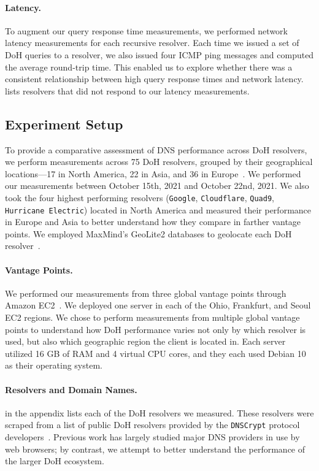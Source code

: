 \paragraph{Latency.}
To augment our query response time measurements, we performed network latency measurements for each recursive resolver.
Each time we issued a set of DoH queries to a resolver, we also issued four ICMP ping messages and computed the average round-trip time.
This enabled us to explore whether there was a consistent relationship between high query response times and network latency.
 lists resolvers that did not respond to our latency measurements.

\subsection{Experiment Setup}
To provide a comparative assessment of DNS performance across DoH resolvers, we perform measurements across 75 DoH resolvers, grouped by their geographical locations—17 in North America, 22 in Asia, and 36 in Europe~\cite{dnscrypt}.
We performed our measurements between October 15th, 2021 and October 22nd, 2021.
We also took the four highest performing resolvers (\texttt{Google}, \texttt{Cloudflare}, \texttt{Quad9}, \texttt{Hurricane Electric}) located in North America and measured their performance in Europe and Asia to better understand how they compare in farther vantage points.  
We employed MaxMind's GeoLite2 databases to geolocate each DoH resolver~\cite{maxmind}.

\paragraph{Vantage Points.}
We performed our measurements from three global vantage points through Amazon EC2~\cite{amazon_ec2}.
We deployed one server in each of the Ohio, Frankfurt, and Seoul EC2 regions.
We chose to perform measurements from multiple global vantage points to understand how DoH performance varies not only by which resolver is used, but also which geographic region the client is located in.
Each server utilized 16 GB of RAM and 4 virtual CPU cores, and they each used Debian 10 as their operating system.

\paragraph{Resolvers and Domain Names.}
 in the appendix lists each of the DoH resolvers we measured.
These resolvers were scraped from a list of public DoH resolvers provided by the \texttt{DNSCrypt} protocol developers~\cite{dnscrypt-public-resolvers}.
Previous work has largely studied major DNS providers in use by web browsers; by contrast, we attempt to better understand the performance of the larger DoH ecosystem.

